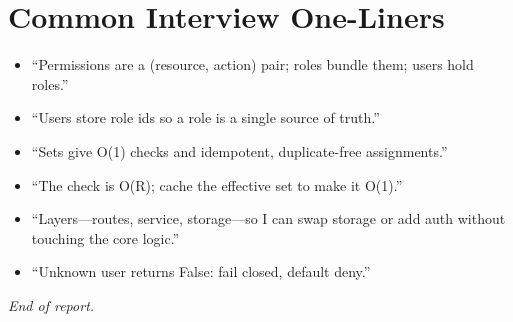 \documentclass[11pt,a4paper]{report}
\begin{document}
\section{Common Interview One-Liners}
\begin{itemize}[leftmargin=1.4em]
  \item ``Permissions are a (resource, action) pair; roles bundle them; users
        hold roles.''
  \item ``Users store role ids so a role is a single source of truth.''
  \item ``Sets give O(1) checks and idempotent, duplicate-free assignments.''
  \item ``The check is O(R); cache the effective set to make it O(1).''
  \item ``Layers---routes, service, storage---so I can swap storage or add auth
        without touching the core logic.''
  \item ``Unknown user returns False: fail closed, default deny.''
\end{itemize}

\vspace{1em}
\begin{center}
\textit{End of report.}
\end{center}
\end{document}
